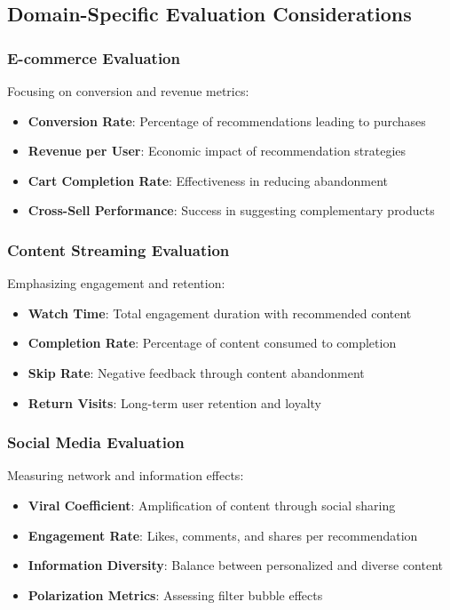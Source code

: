 \subsection{Domain-Specific Evaluation Considerations}

\subsubsection{E-commerce Evaluation}

Focusing on conversion and revenue metrics:

\begin{itemize}
    \item \textbf{Conversion Rate}: Percentage of recommendations leading to purchases
    \item \textbf{Revenue per User}: Economic impact of recommendation strategies
    \item \textbf{Cart Completion Rate}: Effectiveness in reducing abandonment
    \item \textbf{Cross-Sell Performance}: Success in suggesting complementary products
\end{itemize}

\subsubsection{Content Streaming Evaluation}

Emphasizing engagement and retention:

\begin{itemize}
    \item \textbf{Watch Time}: Total engagement duration with recommended content
    \item \textbf{Completion Rate}: Percentage of content consumed to completion
    \item \textbf{Skip Rate}: Negative feedback through content abandonment
    \item \textbf{Return Visits}: Long-term user retention and loyalty
\end{itemize}

\subsubsection{Social Media Evaluation}

Measuring network and information effects:

\begin{itemize}
    \item \textbf{Viral Coefficient}: Amplification of content through social sharing
    \item \textbf{Engagement Rate}: Likes, comments, and shares per recommendation
    \item \textbf{Information Diversity}: Balance between personalized and diverse content
    \item \textbf{Polarization Metrics}: Assessing filter bubble effects
\end{itemize}


